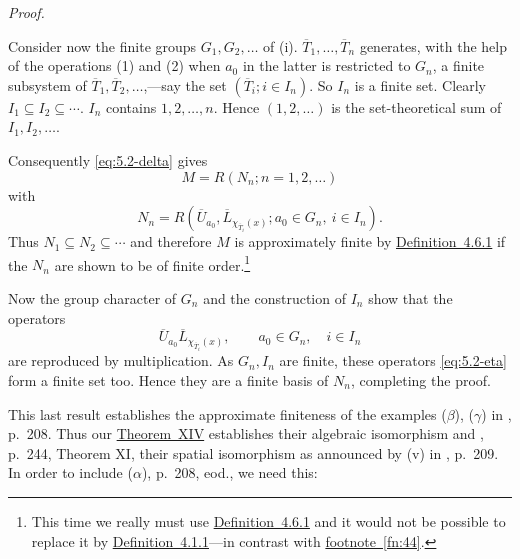\documentclass[b5paper,twoside]{article}
\newcommand{\thmref}[2]{\hyperref[#1]{\mbox{Theorem~#2}}}
\newcommand{\defref}[2]{\hyperref[#1]{\mbox{Definition~#2}}}
\theoremstyle{mvnplain}
\renewenvironment{proof}[1][Proof]{%
  \par\addvspace{0.35\baselineskip}%
  \noindent\textit{#1.}\ \normalfont\ignorespaces
}{%
  \par\addvspace{0.35\baselineskip}%
}
\newcommand{\M}{\mathbf M}
\newcommand{\N}{\mathbf N}
\newcommand{\R}{\mathbf R}
\def\M{M}%
\def\N{N}%
\def\R{R}%
\def\mathfrak#1{#1}%
\begin{document}
\begin{proof}
Consider now the finite groups \(\mathfrak G_1,\mathfrak G_2,\ldots\) of
(i). \(\overline T_1,\ldots,\overline T_n\) generates, with the help of the
operations (1) and (2) when \(a_0\) in the latter is restricted to
\(\mathfrak G_n\), a finite subsystem of
\(\overline T_1,\overline T_2,\ldots\),---say the set
\((\overline T_i;i\in I_n)\). So \(I_n\) is a finite set. Clearly
\(I_1\subseteq I_2\subseteq\cdots\). \(I_n\) contains
\(1,2,\ldots,n\). Hence \((1,2,\ldots)\) is the set-theoretical sum of
\(I_1,I_2,\ldots\).

Consequently \eqref{eq:5.2-delta} gives
\begin{equation}\tag{5.2.\(\epsilon\)}\label{eq:5.2-epsilon}
 \M=\R(\N_n;n=1,2,\ldots)
\end{equation}
with
\begin{equation}\tag{5.2.\(\zeta\)}\label{eq:5.2-zeta}
 \N_n=\R(\overline U_{a_0},\overline L_{\chi_{\overline T_i}(x)};
 a_0\in\mathfrak G_n,\ i\in I_n).
\end{equation}
Thus \(\N_1\subseteq\N_2\subseteq\cdots\) and therefore \(\M\) is
approximately finite by \defref{def:4.6.1}{4.6.1} if the \(\N_n\) are shown
to be of finite order.\footnote{This time we really must use
\defref{def:4.6.1}{4.6.1} and it would not be possible to replace it by
\defref{def:4.1.1}{4.1.1}---in contrast with
\hyperref[fn:44]{footnote~\ref*{fn:44}}.}

Now the group character of \(\mathfrak G_n\) and the construction of \(I_n\)
show that the operators
\begin{equation}\tag{5.2.\(\eta\)}\label{eq:5.2-eta}
 \overline U_{a_0}\overline L_{\chi_{\overline T_i}(x)},
 \qquad a_0\in\mathfrak G_n,\quad i\in I_n
\end{equation}
are reproduced by multiplication. As \(\mathfrak G_n,I_n\) are finite, these
operators \eqref{eq:5.2-eta} form a finite set too. Hence they are a finite
basis of \(\N_n\), completing the proof.
\end{proof}

This last result establishes the approximate finiteness of the examples
(\(\beta\)), (\(\gamma\)) in \cite{ref5}, p.~208. Thus our
\thmref{thm:XIV}{XIV} establishes their algebraic isomorphism and
\cite{ref6}, p.~244, Theorem XI, their spatial isomorphism as
announced by (v) in \cite{ref5}, p.~209.
In order to include (\(\alpha\)), p.~208, eod., we need this:
\end{document}
